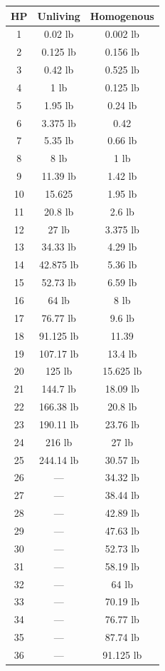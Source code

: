 \begin{multicols*}{3}
	\begin{center}
		\begin{tabular}{|c|c|c|}
			\hline
			HP & Unliving & Homogenous\\
			\hline
			\hline
			1 & 0.02 lb & 0.002 lb\\
			2 & 0.125 lb & 0.156 lb \\
			3 & 0.42 lb & 0.525 lb \\
			4 & 1 lb & 0.125 lb \\
			5 & 1.95 lb & 0.24 lb \\
			6 & 3.375 lb & 0.42 \\
			7 & 5.35 lb & 0.66 lb \\
			8 & 8 lb & 1 lb \\
			9 & 11.39 lb & 1.42 lb \\
			10 & 15.625 & 1.95 lb \\
			11 & 20.8 lb & 2.6 lb \\
			12 & 27 lb & 3.375 lb \\
			13 & 34.33 lb & 4.29 lb \\
			14 & 42.875 lb & 5.36 lb \\
			15 & 52.73 lb & 6.59 lb \\
			16 & 64 lb & 8 lb \\
			17 & 76.77 lb & 9.6 lb \\
			18 & 91.125 lb & 11.39 \\
			19 & 107.17 lb & 13.4 lb \\
			20 & 125 lb & 15.625 lb \\
			21 & 144.7 lb & 18.09 lb \\
			22 & 166.38 lb & 20.8 lb\\
			23 & 190.11 lb & 23.76 lb \\
			24 & 216 lb & 27 lb \\
			25 & 244.14 lb & 30.57 lb \\
			26 & — & 34.32 lb \\
			27 & — & 38.44 lb \\
			28 & — & 42.89 lb \\
			29 & — & 47.63 lb \\
			30 & — & 52.73 lb \\
			31 & — & 58.19 lb \\
			32 & — & 64 lb \\
			33 & — & 70.19 lb \\
			34 & — & 76.77 lb \\
			35 & — & 87.74 lb \\
			36 & — & 91.125 lb \\

\end{tabular}
\end{center}
\end{multicols*}
